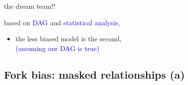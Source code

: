 %
%
\begin{lhframe}[rhgraphic={\texttt{[image: fork1\_reg2.png]}}]
	{the dream team!!}
	
	based on \textcolor{blue}{DAG} and \textcolor{blue}{statistical analysis},
	\begin{itemize}
		\item the less biased model is the second, \\
		{\small \textcolor{blue}{(assuming our DAG is true)} }
	\end{itemize}
\end{lhframe}
%
%
\subsection{Fork bias: masked relationships (a)}
%
%
\begin{frame}[t, negative]
	\subsectionpage
\end{frame}
%
%
